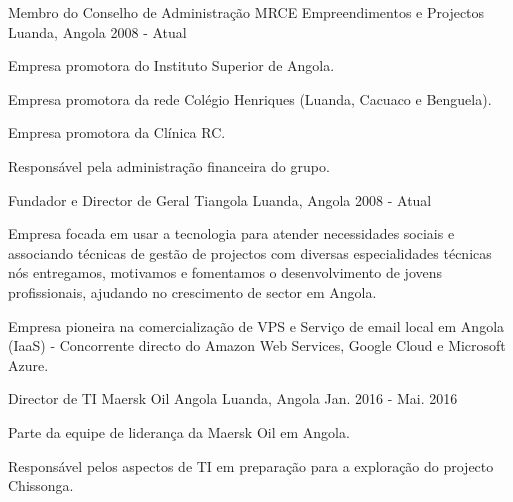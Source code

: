 


\begin{cventries}


\cventry
{Membro do Conselho de Administração} %
{MRCE Empreendimentos e Projectos} %
{Luanda, Angola} %
{2008 - Atual} %
{ %
\begin{cvitems}
\item {Empresa promotora do Instituto Superior de Angola.}
\item {Empresa promotora da rede Colégio Henriques (Luanda, Cacuaco e Benguela).}
\item {Empresa promotora da Clínica RC.}
\item {Responsável pela administração financeira do grupo.}
\end{cvitems}
}


\cventry
{Fundador e Director de Geral} %
{Tiangola} %
{Luanda, Angola} %
{2008 - Atual} %
{ %
\begin{cvitems}
\item {Empresa focada em usar a tecnologia para atender necessidades sociais e associando técnicas de gestão de projectos com diversas especialidades técnicas nós entregamos, motivamos e fomentamos o desenvolvimento de jovens profissionais, ajudando no crescimento de sector em Angola.}
\item {Empresa pioneira na comercialização de VPS e Serviço de email local em Angola (IaaS) - Concorrente directo do Amazon Web Services, Google Cloud e Microsoft Azure.}
\end{cvitems}
}


\cventry
{Director de TI} %
{Maersk Oil Angola} %
{Luanda, Angola} %
{Jan. 2016 - Mai. 2016} %
{ %
\begin{cvitems}
\item {Parte da equipe de liderança da Maersk Oil em Angola.}
\item {Responsável pelos aspectos de TI em preparação para a exploração do projecto Chissonga.}
\end{cvitems}
}


\end{cventries}
